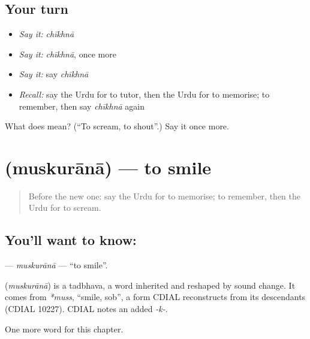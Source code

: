 \subsection*{Your turn}
\begin{itemize}
\raggedright
  \item \emph{Say it:} \emph{chīkhnā}
  \item \emph{Say it:} \emph{chīkhnā}, once more
  \item \emph{Say it:} say \emph{chīkhnā}
  \item \emph{Recall:} say the Urdu for to tutor, then the Urdu for to memorise; to remember, then say \emph{chīkhnā} again
\end{itemize}

\begin{tcolorbox}[breakable,colback=teal!4,colframe=teal!35!black,title={Before you move on}]
What does  mean? (\textquotedblleft{}To scream, to shout\textquotedblright{}.) Say it once more.
\end{tcolorbox}
\section[\texorpdfstring{\ur{مسکرانا} (muskurānā)}{مسکرانا (muskurānā)}]{ (muskurānā) — to smile}

\label{lesson:UR-C147-muskurana}



\begin{quote}
Before the new one: say the Urdu for to memorise; to remember, then the Urdu for to scream.
\end{quote}

\subsection*{You'll want to know: }
\textbf{} — \emph{muskurānā} — \textquotedblleft{}to smile\textquotedblright{}.

\begin{cousinweb}
\textbf{} (\emph{muskurānā}) is a tadbhava, a word inherited and reshaped by sound change. It comes from \emph{*muss}, \textquotedblleft{}smile, sob\textquotedblright{}, a form CDIAL reconstructs from its descendants (CDIAL 10227). CDIAL notes an added \emph{-k-}.
\end{cousinweb}

\begin{grammarlens}[title={What you've built}]
One more word for this chapter.
\end{grammarlens}

